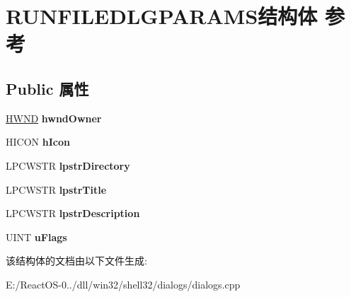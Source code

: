 \hypertarget{struct_r_u_n_f_i_l_e_d_l_g_p_a_r_a_m_s}{}\section{R\+U\+N\+F\+I\+L\+E\+D\+L\+G\+P\+A\+R\+A\+M\+S结构体 参考}
\label{struct_r_u_n_f_i_l_e_d_l_g_p_a_r_a_m_s}
\subsection*{Public 属性}
\begin{DoxyCompactItemize}
\item 
\mbox{\label{struct_r_u_n_f_i_l_e_d_l_g_p_a_r_a_m_s_a39e3f8120e2c89f9d84c917a1ff7d010}} 
\hyperlink{interfacevoid}{H\+W\+ND} {\bfseries hwnd\+Owner}
\item 
\mbox{\label{struct_r_u_n_f_i_l_e_d_l_g_p_a_r_a_m_s_afc840a6cc7795f387391fd3645a88d2a}} 
H\+I\+C\+ON {\bfseries h\+Icon}
\item 
\mbox{\label{struct_r_u_n_f_i_l_e_d_l_g_p_a_r_a_m_s_a51ebb3009d8dba87e5488f4148809f2f}} 
L\+P\+C\+W\+S\+TR {\bfseries lpstr\+Directory}
\item 
\mbox{\label{struct_r_u_n_f_i_l_e_d_l_g_p_a_r_a_m_s_a6d6dc042f77e39a99bfc5b89aa9b3f79}} 
L\+P\+C\+W\+S\+TR {\bfseries lpstr\+Title}
\item 
\mbox{\label{struct_r_u_n_f_i_l_e_d_l_g_p_a_r_a_m_s_a93d50d902301445310ce5bdceb85e742}} 
L\+P\+C\+W\+S\+TR {\bfseries lpstr\+Description}
\item 
\mbox{\label{struct_r_u_n_f_i_l_e_d_l_g_p_a_r_a_m_s_af1d904d128b969d305436565316d7daa}} 
U\+I\+NT {\bfseries u\+Flags}
\end{DoxyCompactItemize}


该结构体的文档由以下文件生成\+:\begin{DoxyCompactItemize}
\item 
E\+:/\+React\+O\+S-\/0../dll/win32/shell32/dialogs/dialogs.\+cpp\end{DoxyCompactItemize}
